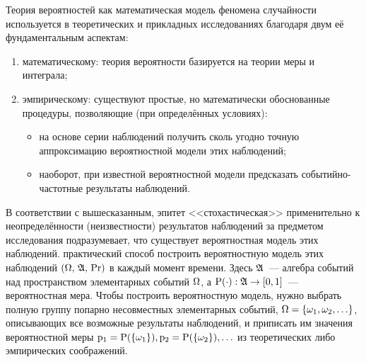  Теория вероятностей как математическая модель феномена случайности используется в теоретических и прикладных исследованиях благодаря двум её фундаментальным аспектам:
\begin{enumerate}
  \item математическому: теория вероятности базируется на теории меры и интеграла;
  \item эмпирическому: существуют простые, но математически обоснованные процедуры, позволяющие (при определённых условиях):
  \begin{itemize}
  \item  на основе серии наблюдений получить сколь угодно точную аппроксимацию вероятностной модели этих наблюдений;
  \item наоборот, при известной вероятностной модели предсказать событийно-частотные результаты наблюдений. 
  \end{itemize} 
\end{enumerate}

В соответствии с вышесказанным, эпитет <<стохастическая>> применительно к  неопределённости (неизвестности) результатов наблюдений за предметом исследования подразумевает, что существует вероятностная модель этих наблюдений. 
практический способ построить вероятностную модель этих наблюдений %
${(\Omega,\,{\mathfrak{A}},\,{\mathrm{Pr}})}$ в каждый момент времени. Здесь ${\mathfrak{A}}$~--- алгебра событий над пространством элементарных событий $\Omega$, а ${\mathrm{P}}(\cdot): {\mathfrak{A}} \to [0,1]$~--- вероятностная мера. Чтобы построить вероятностную модель, нужно выбрать полную группу попарно несовместных элементарных событий, $\Omega = \{\omega_1, \omega_2, \ldots\}$, описывающих все возможные результаты наблюдений, и приписать им значения вероятностной меры ${\mathrm{p}}_1 = {\mathrm{P}}(\{\omega_1\}), {\mathrm{p}}_2 = {\mathrm{P}}(\{\omega_2\}), \ldots$ из теоретических либо эмпирических соображений. 

